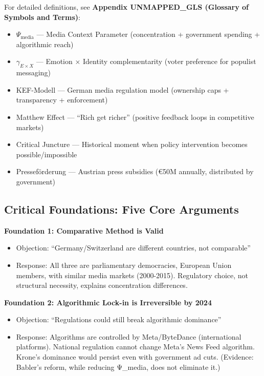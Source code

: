 {For detailed definitions, see \textbf{Appendix UNMAPPED_GLS (Glossary of Symbols and Terms)}:

\begin{itemize}[nosep]
\item $\Psi_{\text{media}}$ --- Media Context Parameter (concentration + government spending + algorithmic reach)
\item $\gamma_{E \times X}$ --- Emotion × Identity complementarity (voter preference for populist messaging)
\item KEF-Modell --- German media regulation model (ownership caps + transparency + enforcement)
\item Matthew Effect --- ``Rich get richer'' (positive feedback loops in competitive markets)
\item Critical Juncture --- Historical moment when policy intervention becomes possible/impossible
\item Presseförderung --- Austrian press subsidies (€50M annually, distributed by government)
\end{itemize}


\subsection*{Critical Foundations: Five Core Arguments}

\textbf{Foundation 1: Comparative Method is Valid}
\begin{itemize}
\item Objection: ``Germany/Switzerland are different countries, not comparable''
\item Response: All three are parliamentary democracies, European Union members, with similar media markets (2000-2015).
  Regulatory choice, not structural necessity, explains concentration differences.
\end{itemize}

\textbf{Foundation 2: Algorithmic Lock-in is Irreversible by 2024}
\begin{itemize}
\item Objection: ``Regulations could still break algorithmic dominance''
\item Response: Algorithms are controlled by Meta/ByteDance (international platforms).
  National regulation cannot change Meta's News Feed algorithm. Krone's dominance would persist even with government ad cuts.
  (Evidence: Babler's reform, while reducing Ψ_media, does not eliminate it.)
\end{itemize}

}
